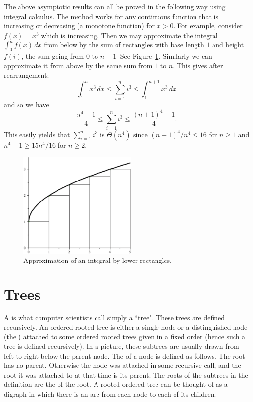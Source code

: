The above asymptotic results can all be proved in the following way
using integral calculus. The method works for any continuous function
that is increasing or decreasing (a monotone function) for $x>0$. For
example, consider $f(x) = x^3$ which is increasing. Then we may
approximate the integral $\int_0^n f(x) \, dx$ from below by the sum of
rectangles with base length $1$ and height $f(i)$, the sum going from $0$ to
$n-1$. See Figure~\ref{fig:intapprox}. Similarly we can approximate it
from above by the same sum from $1$ to $n$. This gives after
rearrangement:
$$
\int_1^{n} x^3 \, dx \leq \sum_{i=1}^n i^3 \leq \int_{1}^{n+1} x^3 \, dx
$$
and so we have 
$$\frac{n^4 -1}{4} \leq \sum_{i=1}^n i^3 \leq \frac{(n+1)^4 - 1}{4}.$$
This easily yields that $\sum_{i=1}^n i^3$ is $\Theta(n^4)$ since
$(n+1)^4/n^4 \leq 16$ for $n\geq 1$ and $n^4 - 1 \geq 15n^4/16$ for $n\geq 2$.

\begin{figure}
\centerline{\includegraphics[width=2.3in]{figs/riemann-lower-bw.eps}}
\caption{Approximation of an integral by lower rectangles.}
\label{fig:intapprox}
\end{figure}

\section{Trees}
\label{sec:app:trees}

A  is what computer scientists call simply
a ``tree". These trees are defined recursively. An ordered rooted tree
is either a single node or a distinguished node (the ) 
attached to some ordered rooted trees given in a fixed order 
(hence such a tree is defined recursively). In a picture, these subtrees 
are usually drawn from left to right below the parent node.  
The  of a node is defined as follows. The root has no parent. 
Otherwise the node was attached in some recursive call, and the root 
it was attached to at that time is its parent. The roots of the subtrees 
in the definition are the  of the root. A rooted 
ordered tree can be thought of as a digraph in which there is
an arc from each node to each of its children.

